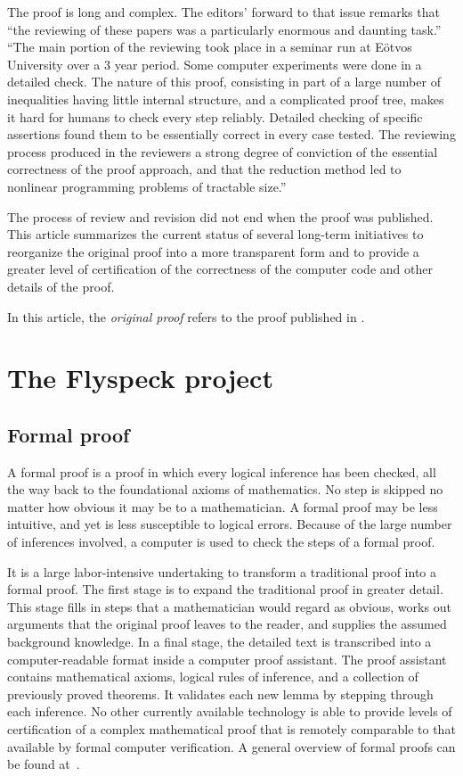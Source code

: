 \documentclass[11pt]{amsart}
\begin{document}
The proof is long and complex.  The editors' forward to that issue remarks
that ``the reviewing of these papers was a particularly enormous and daunting task.''
``The main portion of the reviewing took place in a seminar run at E\"otvos University
over a 3 year period.  Some computer experiments were done in a detailed check.
The nature of this proof, consisting in part of a large number of inequalities having
little internal structure, and a complicated proof tree, makes it hard for humans
to check every step reliably.  Detailed checking of specific assertions found them to
be essentially correct in every case tested.  The reviewing process produced in the
reviewers a strong degree of conviction of the essential correctness of the proof
approach, and that the reduction method led to nonlinear programming problems of
tractable size.''

The process of review and revision did not end when the proof was published.
This article summarizes the current status of several long-term initiatives to
reorganize the original proof into a more transparent form and to provide a greater
level of certification of the correctness of the computer code and other details of the proof.

In this article, the {\it original proof} refers to the proof published
in \cite{Hales:2006:DCG}.

\section{The Flyspeck project}

\subsection*{Formal proof}

A formal proof is a proof in which every logical inference has been checked, all the way back to the foundational axioms of mathematics.  No step is skipped no matter how obvious it may be to a mathematician.  
A formal proof may be less intuitive, and yet is less susceptible to logical
errors.  Because of the large number of inferences involved, a computer is used to check the steps of a formal proof.

It is a large labor-intensive
undertaking to transform a traditional proof
into a formal proof.   The first stage is to expand the traditional proof in greater detail.  This stage fills in steps that a mathematician would regard as obvious,  works out arguments that the original proof leaves to the reader,  and supplies the assumed background knowledge.  
In a final stage, the detailed text is transcribed into a computer-readable format inside
a computer proof assistant.  The proof assistant  contains  mathematical axioms, logical rules of inference, and a collection of previously proved theorems. 
It validates each new lemma by stepping through each inference.  No other currently available technology is able to provide levels of certification of a complex mathematical proof that is remotely comparable to that available by formal computer verification.  A general overview
of formal proofs can be found at~\cite{gonthier:2008:formal, Hales:2008:formal, Harrison:2008:formal}.
\end{document}
